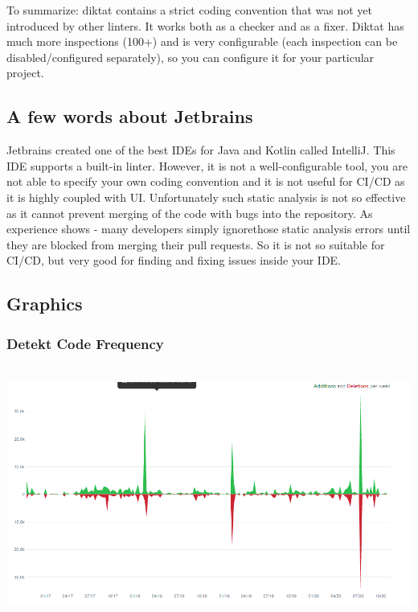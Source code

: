 \par To summarize: diktat contains a strict coding convention that was not yet introduced by other linters. It works both as a checker and as a fixer. Diktat has much more inspections (100+) and is very configurable (each inspection can be disabled/configured separately), so you can configure it for your particular project.

\subsection{A few words about Jetbrains}
\par Jetbrains created one of the best IDEs for Java and Kotlin called IntelliJ. This IDE supports a built-in linter. However, it is not a well-configurable tool, you are not able to specify your own coding convention and it is not useful for CI/CD as it is highly coupled with UI. Unfortunately such static analysis is not so effective as it cannot prevent merging of the code with bugs into the repository. As experience shows - many developers simply ignorethose static analysis errors until they are blocked from merging their pull requests. So it is not so suitable for CI/CD, but very good for finding and fixing issues inside your IDE.

\subsection{Graphics}

\subsubsection{Detekt Code Frequency}
\hfill\\
    \includegraphics[scale = 0.5]{pictures/detekt.png}

